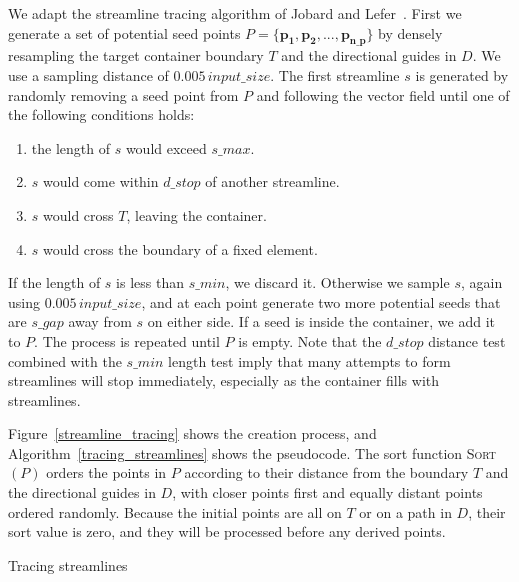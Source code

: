 We adapt the streamline tracing algorithm of Jobard and Lefer~\cite{Jobard1997}.
First we generate a set of potential seed points $P = \{ \bm{p_{1}}, \bm{p_{2}}, ... , \bm{p_{n\text{\_}p}}\}$  by
densely resampling the target container boundary $T$ and the directional guides in $D$.
We use a sampling distance of $0.005\,input\_size$.
The first streamline $s$ is generated by randomly removing a seed point from $P$ and following
the vector field until one of the following conditions holds:

\begin{enumerate}
\item the length of $s$ would exceed $s\_max$.
\item $s$ would come within $d\_stop$ of another streamline.
\item $s$ would cross $T$, leaving the container.
\item $s$ would cross the boundary of a fixed element.
\end{enumerate}


If the length of $s$ is less than $s\_min$, we discard it. Otherwise we sample 
$s$, again using $0.005\,input\_size$, and at each point generate two more
potential seeds that are $s\_gap$ away from $s$ on either side. If a seed is
inside the container, we add it to $P$.  The process is repeated until $P$ is empty.
Note that the $d\_stop$ distance test combined with the $s\_min$ length
test imply that many attempts to form streamlines will stop immediately,
especially as the container fills with streamlines.

Figure~\ref{streamline_tracing} shows the creation process, and 
Algorithm~\ref{tracing_streamlines} shows the pseudocode.
The sort function \textsc{Sort}$(P)$ orders the points in $P$ according to their distance from the
boundary $T$ and the directional guides in $D$, with closer points first and equally distant
points ordered randomly. Because the initial points are all on $T$ or on a path in $D$, their
sort value is zero, and they will be processed before any derived points. 

\begin{algorithm}[h!]
\caption{Tracing streamlines} 
\label{tracing_streamlines}
\end{algorithm}

